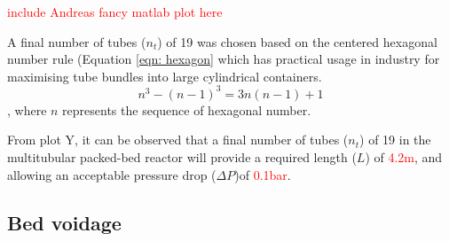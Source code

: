 \textcolor{red}{include Andreas fancy matlab plot here}

A final number of tubes ($n_t$) of 19 was chosen based on the centered hexagonal number rule (Equation \ref{eqn: hexagon} which has practical usage in industry for maximising tube bundles into large cylindrical containers. 
\begin{equation}
    n^3 - (n-1)^3 = 3n(n-1)+1
    \label{eqn: hexagon}
\end{equation},
where $n$ represents the sequence of hexagonal number. 

From plot Y, it can be observed that a final number of tubes ($n_t$) of 19 in the multitubular packed-bed reactor will provide a required length ($L$) of \textcolor{red}{4.2m}, and allowing an acceptable pressure drop ($\Delta P$)of \textcolor{red}{0.1bar}.  

\subsection{Bed voidage}
